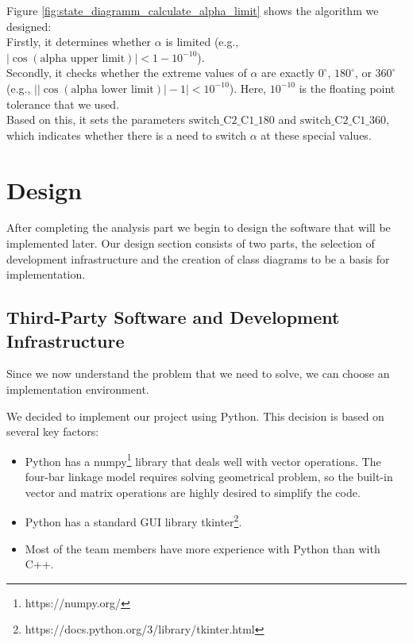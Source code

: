 \documentclass{article}
\begin{document}
\begin{itemize}
    Figure \ref{fig:state_diagramm_calculate_alpha_limit} shows the algorithm we designed:\\
    Firstly, it determines whether \(\alpha\) is limited (e.g., \(|\cos(\text{alpha upper limit})| < 1 - 10^{-10}\)).\\
    Secondly, it checks whether the extreme values of \(\alpha\) are exactly \(0^\circ\), \(180^\circ\), or \(360^\circ\) (e.g., \(\bigl|\bigl| \cos(\text{alpha lower limit}) \bigr| - 1 \bigr| < 10^{-10}\)). Here, \(10^{-10}\) is the floating point tolerance that we used.\\
    Based on this, it sets the parameters \(\text{switch\_C2\_C1\_180}\) and \(\text{switch\_C2\_C1\_360}\), which indicates whether there is a need to switch \(\alpha\) at these special values.

\end{itemize}



\section{Design} \label{ch:design}

After completing the analysis part we begin to design the software that will be implemented later. Our design section consists of two parts, the selection of development infrastructure and the creation of class diagrams to be a basis for implementation.

\subsection{Third-Party Software and Development Infrastructure}

Since we now understand the problem that we need to solve, we can choose an implementation environment.

We decided to implement our project using Python. This decision is based on several key factors:
\begin{itemize}
	\item Python has a numpy\footnote{\label{fn:numpy} https://numpy.org/} library that deals well with vector operations. The four-bar linkage model requires solving geometrical problem, so the built-in vector and matrix operations are highly desired to simplify the code.
	\item Python has a standard GUI library tkinter\footnote{\label{fn:tkinter} https://docs.python.org/3/library/tkinter.html}.
	\item Most of the team members have more experience with Python than with C++.
\end{itemize}
\end{document}
